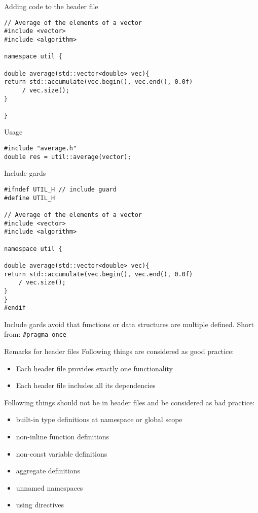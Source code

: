 \documentclass[\classoption]{beamer}
\begin{document}
\begin{frame}[fragile]{Adding code to the header file}
\begin{lstlisting}
// Average of the elements of a vector
#include <vector>
#include <algorithm>

namespace util {

double average(std::vector<double> vec){
return std::accumulate(vec.begin(), vec.end(), 0.0f) 
     / vec.size();
}

}
\end{lstlisting}
\begin{block}{Usage}
\begin{lstlisting}
#include "average.h"
double res = util::average(vector);
\end{lstlisting}
\end{block}
\end{frame}


\begin{frame}[fragile]{Include gards}
\begin{lstlisting}
#ifndef UTIL_H // include guard
#define UTIL_H

// Average of the elements of a vector
#include <vector>
#include <algorithm>

namespace util {

double average(std::vector<double> vec){
return std::accumulate(vec.begin(), vec.end(), 0.0f) 
    / vec.size();
}
}
#endif
\end{lstlisting}
Include gards avoid that functions or data structures are multiple defined. Short from: \lstinline|#pragma once|
\end{frame}

\begin{frame}{Remarks for header files}
Following things are considered as good practice:
\begin{itemize}
\item Each header file provides exactly one functionality 
\item Each header file includes all its dependencies
\end{itemize}
\vspace{0.25cm}
Following things should not be in header files and be considered as bad practice:
\begin{itemize}
\item built-in type definitions at namespace or global scope
\item non-inline function definitions
\item non-const variable definitions
\item aggregate definitions
\item unnamed namespaces
\item using directives
\end{itemize}

\end{frame}
\end{document}
